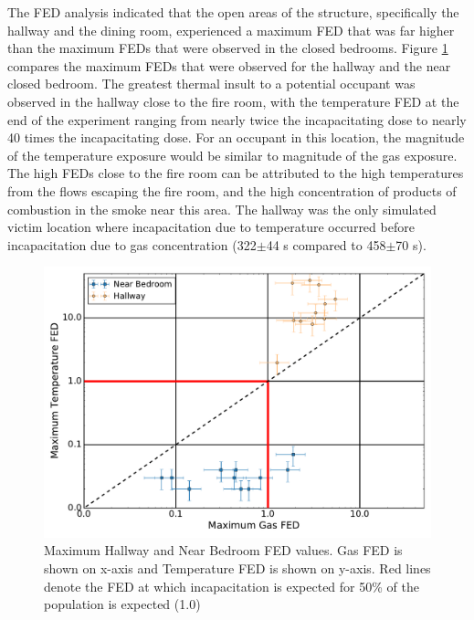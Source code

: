 \documentclass[12pt,oneside]{article}
\begin{document}
The FED analysis indicated that the open areas of the structure, specifically the hallway and the dining room, experienced a maximum FED that was far higher than the maximum FEDs that were observed in the closed bedrooms. Figure \ref{fig:near_FED_compare} compares the maximum FEDs that were observed for the hallway and the near closed bedroom. The greatest thermal insult to a potential occupant was observed in the hallway close to the fire room, with the temperature FED at the end of the experiment ranging from nearly twice the incapacitating dose to nearly 40 times the incapacitating dose. For an occupant in this location, the magnitude of the temperature exposure would be similar to magnitude of the gas exposure. The high FEDs close to the fire room can be attributed to the high temperatures from the flows escaping the fire room, and the high concentration of products of combustion in the smoke near this area. The hallway was the only simulated victim location where incapacitation due to temperature occurred before incapacitation due to gas concentration (322$\pm$44 s compared to 458$\pm$70 s).
\begin{figure}[!ht]	
	\centering
	\includegraphics[width=.75\textwidth]{../Figures/br_compare/Near}
	\caption[Maximum Hallway and Near Bedroom FED values]{Maximum Hallway and Near Bedroom FED values. Gas FED is shown on x-axis and Temperature FED is shown on y-axis. Red lines denote the FED at which incapacitation is expected for 50\% of the population is expected (1.0)}
	\label{fig:near_FED_compare}
\end{figure}
\end{document}
